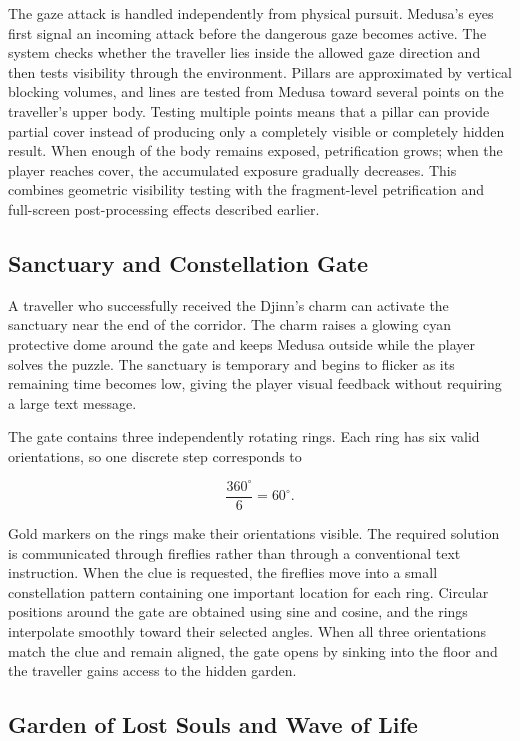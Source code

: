 \documentclass[11pt,a4paper]{article}
\begin{document}
The gaze attack is handled independently from physical pursuit. Medusa's eyes
first signal an incoming attack before the dangerous gaze becomes active. The
system checks whether the traveller lies inside the allowed gaze direction and
then tests visibility through the environment. Pillars are approximated by
vertical blocking volumes, and lines are tested from Medusa toward several
points on the traveller's upper body. Testing multiple points means that a
pillar can provide partial cover instead of producing only a completely visible
or completely hidden result. When enough of the body remains exposed,
petrification grows; when the player reaches cover, the accumulated exposure
gradually decreases. This combines geometric visibility testing with the
fragment-level petrification and full-screen post-processing effects described
earlier.

\subsection{Sanctuary and Constellation Gate}

A traveller who successfully received the Djinn's charm can activate the
sanctuary near the end of the corridor. The charm raises a glowing cyan
protective dome around the gate and keeps Medusa outside while the player solves
the puzzle. The sanctuary is temporary and begins to flicker as its remaining
time becomes low, giving the player visual feedback without requiring a large
text message.

The gate contains three independently rotating rings. Each ring has six valid
orientations, so one discrete step corresponds to

\begin{equation}
    \frac{360^\circ}{6}=60^\circ .
\end{equation}

Gold markers on the rings make their orientations visible. The required
solution is communicated through fireflies rather than through a conventional
text instruction. When the clue is requested, the fireflies move into a small
constellation pattern containing one important location for each ring. Circular
positions around the gate are obtained using sine and cosine, and the rings
interpolate smoothly toward their selected angles. When all three orientations
match the clue and remain aligned, the gate opens by sinking into the floor and
the traveller gains access to the hidden garden.

\subsection{Garden of Lost Souls and Wave of Life}
\end{document}
